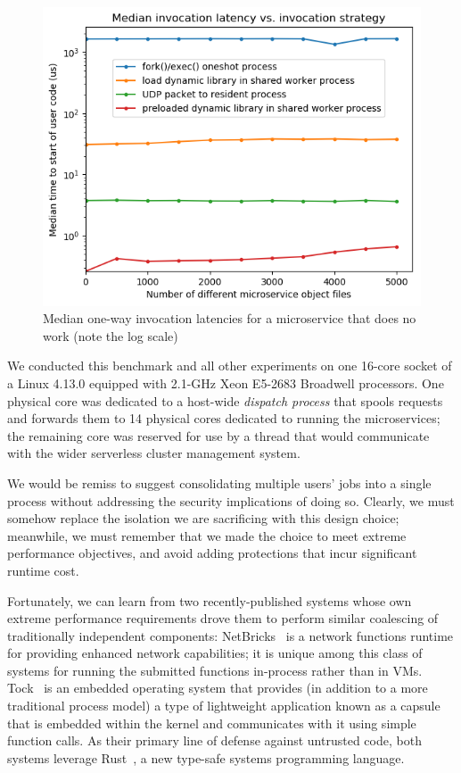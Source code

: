 \begin{figure}
\includegraphics[width=\columnwidth]{figs/2018-02-02-motivation_numfuns-latency-reordered}
\caption{Median one-way invocation latencies for a microservice that does no work (note the log scale)}
\label{fig:motive}
\end{figure}

We conducted this benchmark and all other experiments on one 16-core socket of a
Linux 4.13.0 equipped with 2.1-GHz Xeon E5-2683 Broadwell processors.  One physical
core was dedicated to a host-wide \textit{dispatch process} that spools requests and
forwards them to 14 physical cores dedicated to running the microservices; the
remaining core was reserved for use by a thread that would communicate with the wider
serverless cluster management system.

We would be remiss to suggest consolidating multiple users' jobs into a single
process without addressing the security implications of doing so.  Clearly, we must
somehow replace the isolation we are sacrificing with this design choice; meanwhile,
we must remember that we made the choice to meet extreme performance objectives, and
avoid adding protections that incur significant runtime cost.

Fortunately, we can learn from two recently-published systems whose own extreme
performance requirements drove them to perform similar coalescing of traditionally
independent components:  NetBricks~\cite{Panda2016} is a network functions runtime
for providing enhanced network capabilities; it is unique among this class of
systems for running the submitted functions in-process rather than in VMs.
Tock~\cite{Levy2017} is an embedded operating system that provides (in addition to a
more traditional process model) a type of lightweight application known as a capsule
that is embedded within the kernel and communicates with it using simple function
calls.  As their primary line of defense against untrusted code, both systems
leverage Rust~\cite{www-rustlang}, a new type-safe systems programming language.

